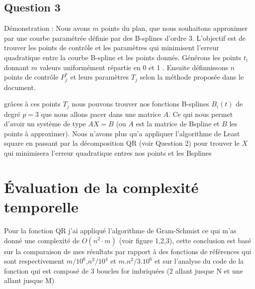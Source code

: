 \documentclass[11pt]{article}
\begin{document}
\subsection{Question 3}
Démonstration : Nous avons \( m \) points du plan, que nous souhaitons approximer par une courbe paramétrée définie par des B-splines d’ordre 3. L’objectif est de trouver les points de contrôle et les paramètres qui minimisent l’erreur quadratique entre la courbe B-spline et les points donnés.
\newline
Générons les points \( t_i \) donnant \( m \) valeurs uniformément répartie en 0 et 1 . Ensuite définnissons \( n \) points de contrôle \( P^*_j \) et leurs paramètres \( T_j \) selon la méthode proposée dans le document.

\newline
grâces à ces points \( T_j \) nous pouvons trouver nos fonctions B-splines \( B_i(t) \) de degré \( p = 3 \) que nous allons pacer dans une matrice \( A \).
Ce qui nous permet d'avoir un système de type \( AX = B \) (ou \( A \) est la matrice de Bspline et \( B \) les points à approximer).
Nous n'avons plus qu'a appliquer l'algorithme de Least square en passant par la décomposition QR (voir Question 2) pour trouver le \( X \) qui minimisera l'erreur quadratique entres nos points et les Bsplines

\newpage

\section{Évaluation de la complexité temporelle}
Pour la fonction QR j'ai appliqué l'algorithme de Gram-Schmist ce qui m'as donné une complexité de \( O(n^2 \cdot m) \) (voir figure 1,2,3), cette conclusion est basé sur la comparaison de mes résultats par rapport à des fonctions de références qui sont respectivement \(m/10^6\),\(n^2/10^4\) et \(m.n^2/3.10^6\)
et sur l'analyse du code de la fonction qui est composé de 3 boucles for imbriquées (2 allant jusque N et une allant jusque M)
\end{document}
